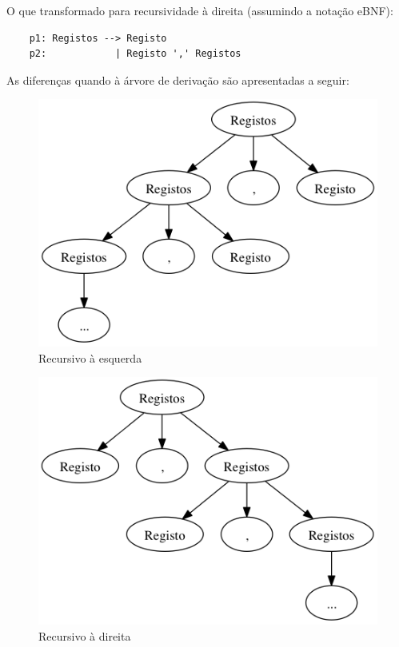 \documentclass[a4paper,11pt,openright,openbib]{article}
\begin{document}
O que transformado para recursividade à direita (assumindo a notação eBNF):

\begin{verbatim}
	p1: Registos --> Registo
	p2:            | Registo ',' Registos
\end{verbatim}

As diferenças quando à árvore de derivação são apresentadas a seguir:

\begin{figure}[!htb]
	\begin{center}
		\includegraphics[scale=.5]{../ficha5/lr.png}
	\end{center}	
	\caption{\label{lrec}Recursivo à esquerda}
\end{figure}

\begin{figure}[!htb]
	\begin{center}
		\includegraphics[scale=.5]{../ficha5/rr.png}
	\end{center}	
	\caption{\label{lrec}Recursivo à direita}
\end{figure}
\end{document}
